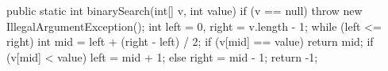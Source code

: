\begin{unipdcode}[language=Java]
public static int binarySearch(int[] v, int value) {
    if (v == null) throw new IllegalArgumentException();
    int left = 0, right = v.length - 1;
    while (left <= right) {
        int mid = left + (right - left) / 2;
        if (v[mid] == value) return mid;
        if (v[mid] < value) left = mid + 1;
        else right = mid - 1;
    }
    return -1;
}
\end{unipdcode}
